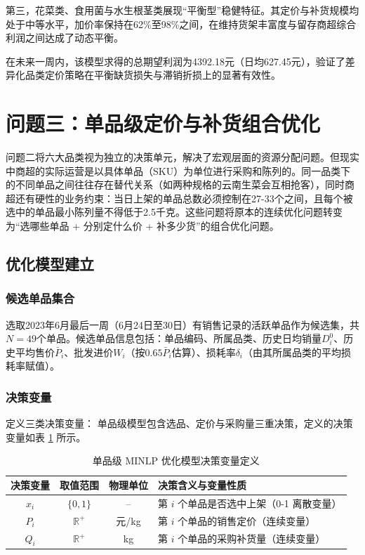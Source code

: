 \documentclass[withoutpreface]{cumcmthesis}
\begin{document}
第三，花菜类、食用菌与水生根茎类展现“平衡型”稳健特征。其定价与补货规模均处于中等水平，加价率保持在62\%至98\%之间，在维持货架丰富度与留存商超综合利润之间达成了动态平衡。

在未来一周内，该模型求得的总期望利润为4392.18元（日均627.45元），验证了差异化品类定价策略在平衡缺货损失与滞销折损上的显著有效性。

\section{问题三：单品级定价与补货组合优化}

问题二将六大品类视为独立的决策单元，解决了宏观层面的资源分配问题。但现实中商超的实际运营是以具体单品（SKU）为单位进行采购和陈列的。同一品类下的不同单品之间往往存在替代关系（如两种规格的云南生菜会互相抢客），同时商超还有硬性的业务约束：当日上架的单品总数必须控制在27-33个之间，且每个被选中的单品最小陈列量不得低于2.5千克。这些问题将原本的连续优化问题转变为“选哪些单品 + 分别定什么价 + 补多少货”的组合优化问题。

\subsection{优化模型建立}

\subsubsection{候选单品集合}

选取2023年6月最后一周（6月24日至30日）有销售记录的活跃单品作为候选集，共$N=49$个单品。候选单品信息包括：单品编码、所属品类、历史日均销量$D_i^0$、历史平均售价$\bar{P}_i$、批发进价$W_i$（按$0.65\bar{P}_i$估算）、损耗率$\delta_i$（由其所属品类的平均损耗率赋值）。

\subsubsection{决策变量}

定义三类决策变量：
单品级模型包含选品、定价与采购量三重决策，定义的决策变量如表 \ref{tab:p3_vars} 所示。

\begin{table}[htbp]
\centering
\caption{单品级 MINLP 优化模型决策变量定义}
\label{tab:p3_vars}
\begin{tabular}{c c c l}
\toprule
\textbf{决策变量} & \textbf{取值范围} & \textbf{物理单位} & \textbf{决策含义与变量性质} \\
\midrule
$x_i$ & $\{0, 1\}$ & -- & 第 $i$ 个单品是否选中上架（0-1 离散变量） \\
$P_i$ & $\mathbb{R}^+$ & 元/kg & 第 $i$ 个单品的销售定价（连续变量） \\
$Q_i$ & $\mathbb{R}^+$ & kg & 第 $i$ 个单品的采购补货量（连续变量） \\
\bottomrule
\end{tabular}
\end{table}
\end{document}
